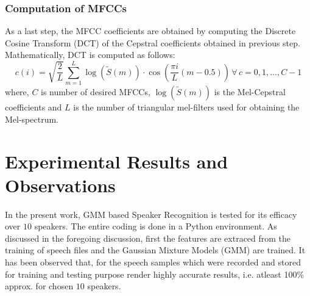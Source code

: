 \documentclass{article}
\begin{document}
{\subsubsection{{Computation of MFCCs}} As a last step, the MFCC coefficients are obtained by computing the Discrete Cosine Transform (DCT) of the Cepstral coefficients obtained in previous step. %
Mathematically, DCT is computed as follows:
\begin{equation}
{c(i)} = \sqrt{\frac{2}{L}}\sum\limits_{m=1}^L{\log{(\tilde S(m))}\cdot \cos{\left(\frac{\pi i}{L}(m-0.5)\right)}}\,\forall\,{c}=0,1,\ldots,{C}-1
\end{equation}
where, ${C}$ is number of desired MFCCs, ${\log{(\tilde S(m))}}$ is the Mel-Cepstral coefficients and ${L}$ is the number of triangular mel-filters used for obtaining the Mel-spectrum.

\section{\textbf{{Experimental Results and Observations}}} 
\label{result}
In the present work, 
GMM based Speaker Recognition is tested for its efficacy over $10$ speakers. The entire coding is done in a Python environment. %
As discussed in the foregoing discussion, first the features are extraced from the training of speech files and the Gaussian Mixture Models (GMM) are trained. It has been observed that, for the speech samples which were recorded and stored for training and testing purpose render highly accurate results, i.e. atleast 100\% approx. for chosen $10$ speakers.

}
\end{document}
